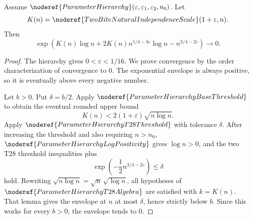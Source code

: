\begin{lemma}
Assume \(\noderef{ParameterHierarchy}(\varepsilon,\varepsilon_1,\varepsilon_2,n_0)\).
Let
\[
K(n)=\noderef{TwoBiteNaturalIndependenceScale}(1+\varepsilon,n).
\]
Then
\[
\exp\!\left(
K(n)\log n+
2K(n)n^{1/4-3\varepsilon}\log n
-n^{3/4-2\varepsilon}
\right)
\longrightarrow 0 .
\]
\end{lemma}
\begin{proof}
The hierarchy gives \(0<\varepsilon<1/16\).  We prove convergence by the
order characterization of convergence to \(0\).  The exponential envelope is
always positive, so it is eventually above every negative number.

Let \(b>0\).  Put \(\delta=b/2\).  Apply
\(\noderef{ParameterHierarchyBaseThreshold}\) to obtain the eventual rounded
upper bound
\[
K(n)<2(1+\varepsilon)\sqrt{n\log n}.
\]
Apply \(\noderef{ParameterHierarchyT28Threshold}\) with tolerance \(\delta\).
After increasing the threshold and also requiring \(n>n_0\),
\(\noderef{ParameterHierarchyLogPositivity}\) gives \(\log n>0\), and the two
T28 threshold inequalities plus
\[
\exp\!\left(-\frac12 n^{3/4-2\varepsilon}\right)\le\delta
\]
hold.  Rewriting \(\sqrt{n\log n}=\sqrt n\,\sqrt{\log n}\), all hypotheses of
\(\noderef{ParameterHierarchyT28Algebra}\) are satisfied with
\(k=K(n)\).  That lemma gives the envelope at \(n\) at most \(\delta\), hence
strictly below \(b\).  Since this works for every \(b>0\), the envelope tends
to \(0\).
\end{proof}
